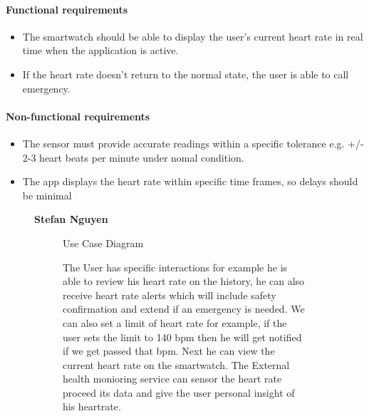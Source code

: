 \documentclass{article}
\begin{document}
	\paragraph{Functional requirements}
		\begin{itemize}
			\item The smartwatch should be able to display the user's current heart rate in real time when the application is active.
			\item If the heart rate doesn't return to the normal state, the user is able to call emergency. 
		\end{itemize}
		
	\paragraph{Non-functional requirements}
		\begin{itemize}
			\item The sensor must provide accurate readings within a specific tolerance e.g. +/- 2-3 heart beats per minute under nomal condition. 
			\item The app displays the heart rate within specific time frames, so delays should be minimal
		\end{itemize}

	\begin{figure}[htbp]
		\textbf{Stefan Nguyen}
		\centering
		\begin{subfigure}{\textwidth}
			\resizebox{\textwidth}{!}{}
			\caption{Use Case Diagram}
		\end{subfigure}
		\begin{subfigure}{\textwidth}
			The User has specific interactions for example he is able to review his heart rate on the history, he can also receive
			heart rate alerts which will include safety confirmation and extend if an emergency is needed. We can also set a limit of heart rate for example,
			if the user sets the limit to 140 bpm then he will get notified if we get passed that bpm. Next he can view the current heart rate on the smartwatch.
			The External health monioring service can sensor the heart rate proceed its data and give the user personal insight of his heartrate. 
		\end{subfigure}
	\end{figure}
\end{document}
